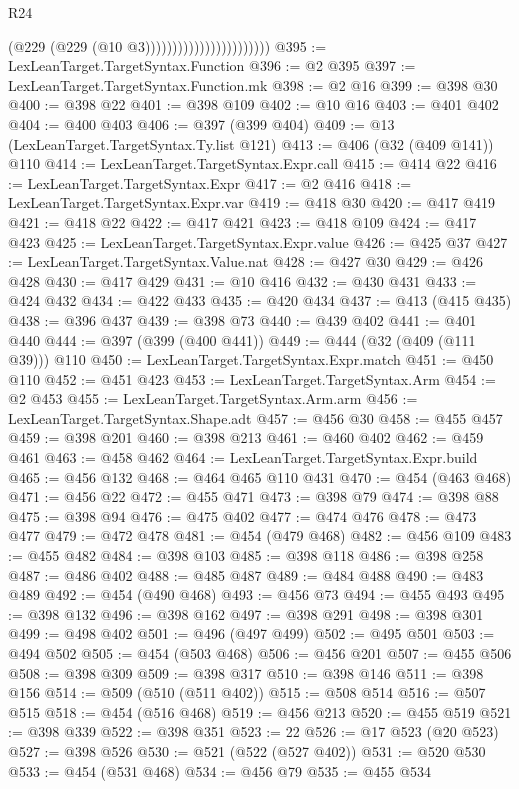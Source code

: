 \begin{lexlean}{R24}
\begin{coremodule}
                                            (@229 (@229 (@10 @3)))))))))))))))))))))))
@395 := LexLeanTarget.TargetSyntax.Function
@396 := @2 @395
@397 := LexLeanTarget.TargetSyntax.Function.mk
@398 := @2 @16
@399 := @398 @30
@400 := @398 @22
@401 := @398 @109
@402 := @10 @16
@403 := @401 @402
@404 := @400 @403
@406 := @397 (@399 @404)
@409 := @13 (LexLeanTarget.TargetSyntax.Ty.list @121)
@413 := @406 (@32 (@409 @141)) @110
@414 := LexLeanTarget.TargetSyntax.Expr.call
@415 := @414 @22
@416 := LexLeanTarget.TargetSyntax.Expr
@417 := @2 @416
@418 := LexLeanTarget.TargetSyntax.Expr.var
@419 := @418 @30
@420 := @417 @419
@421 := @418 @22
@422 := @417 @421
@423 := @418 @109
@424 := @417 @423
@425 := LexLeanTarget.TargetSyntax.Expr.value
@426 := @425 @37
@427 := LexLeanTarget.TargetSyntax.Value.nat
@428 := @427 @30
@429 := @426 @428
@430 := @417 @429
@431 := @10 @416
@432 := @430 @431
@433 := @424 @432
@434 := @422 @433
@435 := @420 @434
@437 := @413 (@415 @435)
@438 := @396 @437
@439 := @398 @73
@440 := @439 @402
@441 := @401 @440
@444 := @397 (@399 (@400 @441))
@449 := @444 (@32 (@409 (@111 @39))) @110
@450 := LexLeanTarget.TargetSyntax.Expr.match
@451 := @450 @110
@452 := @451 @423
@453 := LexLeanTarget.TargetSyntax.Arm
@454 := @2 @453
@455 := LexLeanTarget.TargetSyntax.Arm.arm
@456 := LexLeanTarget.TargetSyntax.Shape.adt
@457 := @456 @30
@458 := @455 @457
@459 := @398 @201
@460 := @398 @213
@461 := @460 @402
@462 := @459 @461
@463 := @458 @462
@464 := LexLeanTarget.TargetSyntax.Expr.build
@465 := @456 @132
@468 := @464 @465 @110 @431
@470 := @454 (@463 @468)
@471 := @456 @22
@472 := @455 @471
@473 := @398 @79
@474 := @398 @88
@475 := @398 @94
@476 := @475 @402
@477 := @474 @476
@478 := @473 @477
@479 := @472 @478
@481 := @454 (@479 @468)
@482 := @456 @109
@483 := @455 @482
@484 := @398 @103
@485 := @398 @118
@486 := @398 @258
@487 := @486 @402
@488 := @485 @487
@489 := @484 @488
@490 := @483 @489
@492 := @454 (@490 @468)
@493 := @456 @73
@494 := @455 @493
@495 := @398 @132
@496 := @398 @162
@497 := @398 @291
@498 := @398 @301
@499 := @498 @402
@501 := @496 (@497 @499)
@502 := @495 @501
@503 := @494 @502
@505 := @454 (@503 @468)
@506 := @456 @201
@507 := @455 @506
@508 := @398 @309
@509 := @398 @317
@510 := @398 @146
@511 := @398 @156
@514 := @509 (@510 (@511 @402))
@515 := @508 @514
@516 := @507 @515
@518 := @454 (@516 @468)
@519 := @456 @213
@520 := @455 @519
@521 := @398 @339
@522 := @398 @351
@523 := 22
@526 := @17 @523 (@20 @523)
@527 := @398 @526
@530 := @521 (@522 (@527 @402))
@531 := @520 @530
@533 := @454 (@531 @468)
@534 := @456 @79
@535 := @455 @534

\end{coremodule}
\end{lexlean}
